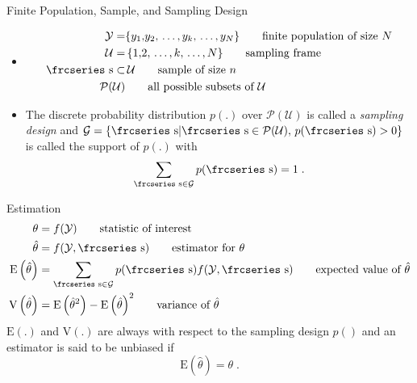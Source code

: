 \documentclass{beamer}\usepackage[]{graphicx}\usepackage[]{color}
\newcommand{\eqname}[1]{\tag*{#1}} %
\newcommand{\textfrc}[1]{{\frcseries#1}}
\newcommand{\mathfrc}[1]{\text{\textfrc{#1}}}
\newcommand{\E}[1]{\text{E}\left(#1\right)}
\newcommand{\V}[1]{\text{V}\left(#1\right)}
\begin{document}
\begin{frame}{\alert{Finite} Population, Sample, and Sampling Design}

 \begin{itemize}
 \item[] 
 \begin{align}
 \mathcal{Y} = & \{ y_1{,}y_2{,}\,\ldots{,}\,y_k{,}\,\ldots{,}\,y_N \} \eqname{finite population of size $N$} \\
 \mathcal{U} = &\, \{ 1{,}2{,}\,\ldots{,}\,k{,}\,\ldots{,}\,N \} \eqname{sampling frame} \\
 \mathfrc{s} \subset &\, \mathcal{U} \eqname{sample of size $n$} \\
 \mathcal{P}(\mathcal{U}) & \eqname{all possible subsets of $\mathcal{U}$}
 \end{align}
 \item[] The discrete probability distribution $p(.)$ over $\mathcal{P}(\mathcal{U})$ is called a \emph{sampling design} and  $\mathcal{G}=\{ \mathfrc{s} | \mathfrc{s} \in \mathcal{P}(\mathcal{U}),\, p(\mathfrc{s}) > 0 \}$ is called the support of $p(.)$ with
$$
\sum_{\mathfrc{s} \in \mathcal{G}} p(\mathfrc{s}) = 1\;.
$$
 \end{itemize}
\end{frame}


\begin{frame}{Estimation}
\begin{align}
 \theta       & = f(\mathcal{Y})  \eqname{statistic of interest} \\
 \hat{\theta} & = f(\mathcal{Y}, \mathfrc{s} )  \eqname{estimator for $\theta$} \\
 \E{\hat{\theta}} & = \sum_{\mathfrc{s} \in \mathcal{G}} p(\mathfrc{s}) f(\mathcal{Y}, \mathfrc{s} )   \eqname{expected value of $\hat{\theta}$} \\
 \V{\hat{\theta}}   & =  \E{\hat{\theta}^2} -  {\E{\hat{\theta}}}^2 \eqname{variance of  $\hat{\theta}$} 
\end{align}
 $\E{.}$ and $\V{.}$ are always with respect to the sampling design $p()$ and
 an estimator is said to be unbiased if
 $$ \E{\hat{\theta}} = \theta\;. $$
\end{frame}
\end{document}
